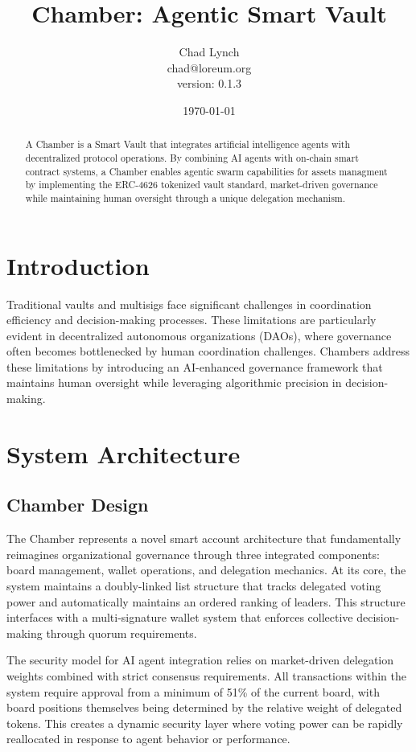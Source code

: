 \documentclass[12pt]{article}
\title{Chamber: Agentic Smart Vault}
\author{Chad Lynch \\ \small{chad@loreum.org} \\ \small{version: 0.1.3}}
\date{\today}
\begin{document}
\maketitle

\begin{abstract}
A Chamber is a Smart Vault that integrates artificial intelligence agents with decentralized protocol operations. By combining AI agents with on-chain smart contract systems, a Chamber enables agentic swarm capabilities for assets managment by implementing the ERC-4626 tokenized vault standard, market-driven governance while maintaining human oversight through a unique delegation mechanism.
\end{abstract}

\section{Introduction}
Traditional vaults and multisigs face significant challenges in coordination efficiency and decision-making processes. These limitations are particularly evident in decentralized autonomous organizations (DAOs), where governance often becomes bottlenecked by human coordination challenges. Chambers address these limitations by introducing an AI-enhanced governance framework that maintains human oversight while leveraging algorithmic precision in decision-making.

\section{System Architecture}

\subsection{Chamber Design}
The Chamber represents a novel smart account architecture that fundamentally reimagines organizational governance through three integrated components: board management, wallet operations, and delegation mechanics. At its core, the system maintains a doubly-linked list structure that tracks delegated voting power and automatically maintains an ordered ranking of leaders. This structure interfaces with a multi-signature wallet system that enforces collective decision-making through quorum requirements.

The security model for AI agent integration relies on market-driven delegation weights combined with strict consensus requirements. All transactions within the system require approval from a minimum of 51\% of the current board, with board positions themselves being determined by the relative weight of delegated tokens. This creates a dynamic security layer where voting power can be rapidly reallocated in response to agent behavior or performance.
\end{document}
